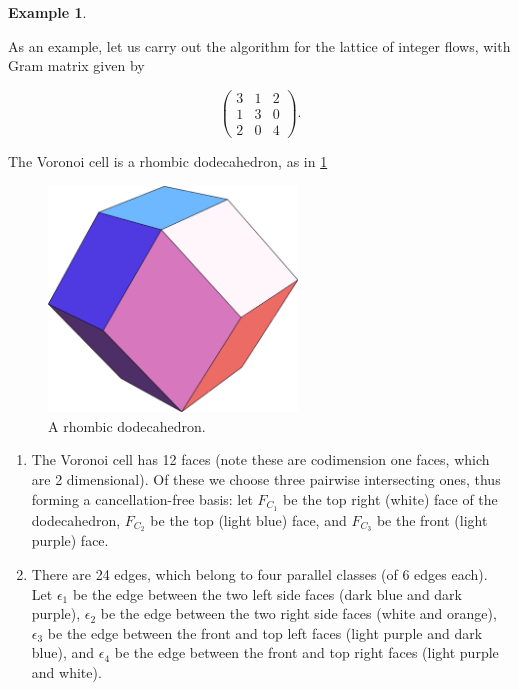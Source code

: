 \documentclass[12pt]{report}
\theoremstyle{definition}
\newtheorem{example}[theorem]{Example}
\theoremstyle{upright}
\begin{document}
\begin{example}\label{ex:Reconstruction}

    As an example, let us carry out the algorithm for the lattice of integer flows, with Gram matrix given by
    
    \[\begin{pmatrix}
        3 & 1 & 2\\
        1 & 3 & 0\\
        2 & 0 & 4
    \end{pmatrix}.\]
    
     The Voronoi cell is a rhombic dodecahedron, as in \cref{fig:RhombicDodecahedron}
    
    \begin{figure}[htbp]
    
        \begin{center}
    
            \includegraphics[height=6cm]{RhombicDodecahedron.png}
            
            \caption{A rhombic dodecahedron.}\label{fig:RhombicDodecahedron}
            
        \end{center}
        
    \end{figure}

    \begin{enumerate}
        \item The Voronoi cell has 12 faces (note these are codimension one faces, which are 2 dimensional).
        Of these we choose three pairwise intersecting ones, thus forming a cancellation-free basis: let $F_{C_1}$ be the top right (white) face of the dodecahedron, $F_{C_2}$ be the top (light blue) face, and $F_{C_3}$ be the front (light purple) face.
        \item There are 24 edges, which belong to four parallel classes (of 6 edges each).
        Let $\epsilon_1$ be the edge between the two left side faces (dark blue and dark purple), $\epsilon_2$ be the edge between the two right side faces (white and orange), $\epsilon_3$ be the edge between the front and top left faces (light purple and dark blue), and $\epsilon_4$ be the edge between the front and top right faces (light purple and white).
    

\end{enumerate}
\end{example}
\end{document}
